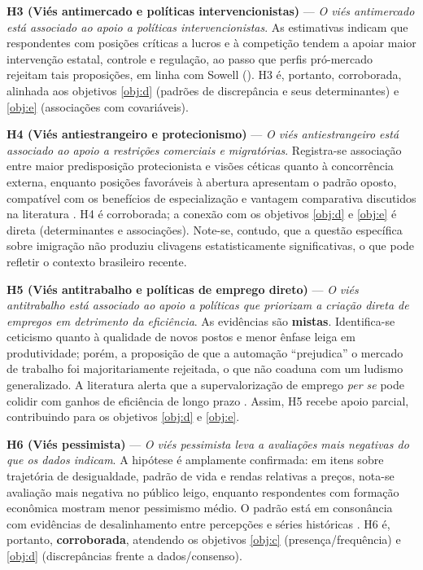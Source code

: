 \textbf{H3 (Viés antimercado e políticas intervencionistas)} — \textit{O viés antimercado está associado ao apoio a políticas intervencionistas}. As estimativas indicam que respondentes com posições críticas a lucros e à competição tendem a apoiar maior intervenção estatal, controle e regulação, ao passo que perfis pró-mercado rejeitam tais proposições, em linha com Sowell (\citeyear{sowell2000basic,sowell2004applied,sowell2007conflict}). H3 é, portanto, corroborada, alinhada aos objetivos \autoref{obj:d} (padrões de discrepância e seus determinantes) e \autoref{obj:e} (associações com covariáveis).

\textbf{H4 (Viés antiestrangeiro e protecionismo)} — \textit{O viés antiestrangeiro está associado ao apoio a restrições comerciais e migratórias}. Registra-se associação entre maior predisposição protecionista e visões céticas quanto à concorrência externa, enquanto posições favoráveis à abertura apresentam o padrão oposto, compatível com os benefícios de especialização e vantagem comparativa discutidos na literatura \cite{bhagwati2003free, The_Myth_of_the_Rational_Voter}. H4 é corroborada; a conexão com os objetivos \autoref{obj:d} e \autoref{obj:e} é direta (determinantes e associações). Note-se, contudo, que a questão específica sobre imigração não produziu clivagens estatisticamente significativas, o que pode refletir o contexto brasileiro recente.

\textbf{H5 (Viés antitrabalho e políticas de emprego direto)} — \textit{O viés antitrabalho está associado ao apoio a políticas que priorizam a criação direta de empregos em detrimento da eficiência}. As evidências são \textbf{mistas}. Identifica-se ceticismo quanto à qualidade de novos postos e menor ênfase leiga em produtividade; porém, a proposição de que a automação “prejudica” o mercado de trabalho foi majoritariamente rejeitada, o que não coaduna com um ludismo generalizado. A literatura alerta que a supervalorização de emprego \emph{per se} pode colidir com ganhos de eficiência de longo prazo \cite{landsburg2012armchair,sowell2007conflict}. Assim, H5 recebe apoio parcial, contribuindo para os objetivos \autoref{obj:d} e \autoref{obj:e}.

\textbf{H6 (Viés pessimista)} — \textit{O viés pessimista leva a avaliações mais negativas do que os dados indicam}. A hipótese é amplamente confirmada: em itens sobre trajetória de desigualdade, padrão de vida e rendas relativas a preços, nota-se avaliação mais negativa no público leigo, enquanto respondentes com formação econômica mostram menor pessimismo médio. O padrão está em consonância com evidências de desalinhamento entre percepções e séries históricas \cite{easterbrook2004progress, ridleyotimista}. H6 é, portanto, \textbf{corroborada}, atendendo os objetivos \autoref{obj:c} (presença/frequência) e \autoref{obj:d} (discrepâncias frente a dados/consenso).

